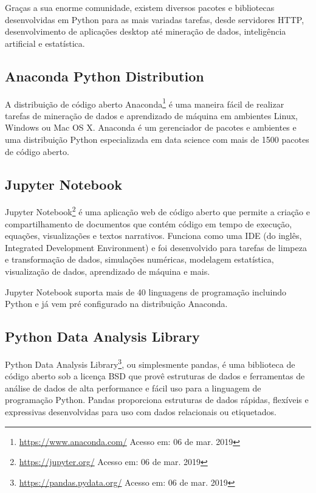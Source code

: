 Graças a sua enorme comunidade, existem diversos pacotes e bibliotecas
desenvolvidas em Python para as mais variadas tarefas, desde servidores HTTP,
desenvolvimento de aplicações desktop até mineração de dados, inteligência
artificial e estatística.

\subsection{Anaconda Python Distribution}

A distribuição de código aberto
Anaconda\footnote{\url{https://www.anaconda.com/} Acesso em: 06 de mar. 2019}  é
uma maneira fácil de realizar tarefas de mineração de dados e aprendizado de
máquina em ambientes Linux, Windows ou Mac OS X. Anaconda é um gerenciador de
pacotes e ambientes e uma distribuição Python especializada em data science com
mais de 1500 pacotes de código aberto.

\subsection{Jupyter Notebook}

Jupyter Notebook\footnote{\url{https://jupyter.org/} Acesso em: 06 de mar. 2019}
é uma aplicação web de código aberto que permite a criação e compartilhamento de
documentos que contém código em tempo de execução, equações, visualizações e
textos narrativos. Funciona como uma IDE (do inglês, Integrated Development
Environment) e foi desenvolvido para tarefas de limpeza e transformação de
dados, simulações numéricas, modelagem estatística, visualização de dados,
aprendizado de máquina e mais.

Jupyter Notebook suporta mais de 40 linguagens de programação incluindo Python e
já vem pré configurado na distribuição Anaconda.

\subsection{Python Data Analysis Library}

Python Data Analysis Library\footnote{\url{https://pandas.pydata.org/} Acesso
em: 06 de mar. 2019}, ou simplesmente pandas, é uma biblioteca de código aberto
sob a licença BSD que provê estruturas de dados e ferramentas de análise de
dados de alta performance e fácil uso para a linguagem de programação Python.
Pandas proporciona estruturas de dados rápidas, flexíveis e expressivas
desenvolvidas para uso com dados relacionais ou etiquetados.


